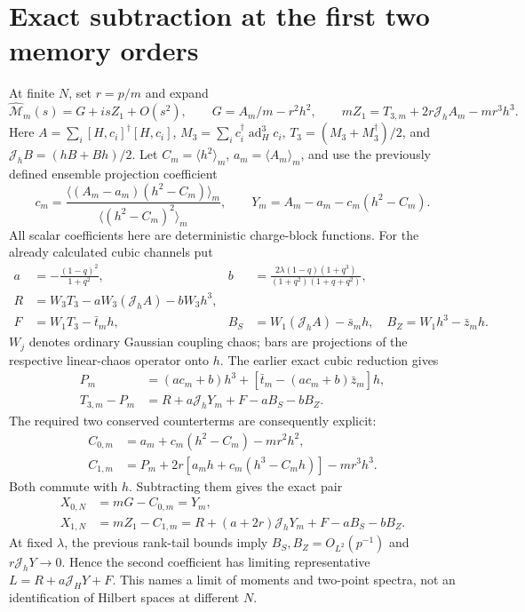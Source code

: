 \documentclass[11pt,a4paper]{article}
\newcommand{\av}[1]{\langle #1\rangle}
\newcommand{\MM}{\widehat{\mathcal M}}
\newcommand{\Jh}{\mathcal J_h}
\begin{document}
\newpage
\section{Exact subtraction at the first two memory orders}
At finite $N$, set $r=p/m$ and expand
\begin{equation}
 \MM_m(s)=G+isZ_1+O(s^2),\qquad
 G=A_m/m-r^2h^2,\qquad
 mZ_1=T_{3,m}+2r\Jh A_m-mr^3h^3.\label{eq:jet}
\end{equation}
Here $A=\sum_i[H,c_i]^\dagger[H,c_i]$,
$M_3=\sum_i c_i^\dagger\operatorname{ad}_H^3c_i$,
$T_3=(M_3+M_3^\dagger)/2$, and $\Jh B=(hB+Bh)/2$.
Let $C_m=\av{h^2}_m$, $a_m=\av{A_m}_m$, and use the previously
defined ensemble projection coefficient
\begin{equation}
 c_m=\frac{\av{(A_m-a_m)(h^2-C_m)}_m}
 {\av{(h^2-C_m)^2}_m},\qquad
 Y_m=A_m-a_m-c_m(h^2-C_m).
\end{equation}
All scalar coefficients here are deterministic charge-block functions.
For the already calculated cubic channels put
\begin{align}
 a&=-\frac{(1-q)^2}{1+q^2},&
 b&=\frac{2\lambda(1-q)(1+q^3)}{(1+q^2)(1+q+q^2)},\\
 R&=W_3T_3-aW_3(\Jh A)-bW_3h^3,\\
 F&=W_1T_3-\bar t_mh,&
 B_S&=W_1(\Jh A)-\bar s_mh,\quad B_Z=W_1h^3-\bar z_mh.
\end{align}
$W_j$ denotes ordinary Gaussian coupling chaos; bars are projections
of the respective linear-chaos operator onto $h$. The earlier exact
cubic reduction gives
\begin{align}
 P_m&=(ac_m+b)h^3+[\bar t_m-(ac_m+b)\bar z_m]h,\\
 T_{3,m}-P_m&=R+a\Jh Y_m+F-aB_S-bB_Z.\label{eq:cubic}
\end{align}
The required two conserved counterterms are consequently explicit:
\begin{align}
 C_{0,m}&=a_m+c_m(h^2-C_m)-mr^2h^2,\\
 C_{1,m}&=P_m+2r[a_mh+c_m(h^3-C_mh)]-mr^3h^3.\label{eq:C1}
\end{align}
Both commute with $h$. Subtracting them gives the exact pair
\begin{align}
 X_{0,N}&=mG-C_{0,m}=Y_m,\\
 X_{1,N}&=mZ_1-C_{1,m}
 =R+(a+2r)\Jh Y_m+F-aB_S-bB_Z.\label{eq:X1}
\end{align}
At fixed $\lambda$, the previous rank-tail bounds imply
$B_S,B_Z=O_{L^2}(p^{-1})$ and $r\Jh Y\to0$. Hence the second
coefficient has limiting representative $L=R+a\mathcal J_HY+F$.
This names a limit of moments and two-point spectra, not an identification
of Hilbert spaces at different $N$.
\end{document}
